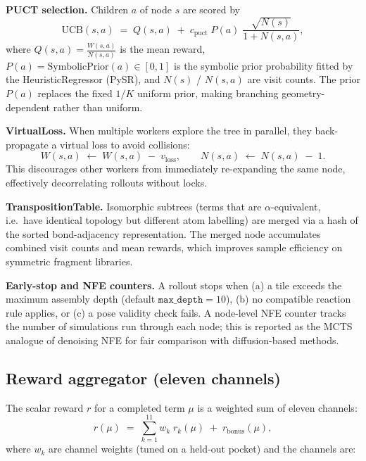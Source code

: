 \documentclass[10pt]{article}
\begin{document}
\medskip\noindent\textbf{PUCT selection.}
Children $a$ of node $s$ are scored by
\[
  \text{UCB}(s,a)
  \;=\;
  Q(s,a)
  \;+\;
  c_{\text{puct}}\;P(a)\;
  \frac{\sqrt{N(s)}}{1+N(s,a)} ,
\]
where $Q(s,a)=\frac{W(s,a)}{N(s,a)}$ is the mean reward,
$P(a)=\text{SymbolicPrior}(a)\in[0,1]$ is the symbolic prior probability
fitted by the HeuristicRegressor (PySR), and $N(s)$ / $N(s,a)$ are visit
counts.  The prior $P(a)$ replaces the fixed $1/K$ uniform prior, making
branching geometry-dependent rather than uniform.

\medskip\noindent\textbf{VirtualLoss.}
When multiple workers explore the tree in parallel, they back-propagate a
virtual loss \cite{addington2021alphazero} to avoid collisions:
\[
  W(s,a) \;\leftarrow\; W(s,a) \;-\; v_{\text{loss}},
  \qquad
  N(s,a) \;\leftarrow\; N(s,a) \;-\; 1 .
\]
This discourages other workers from immediately re-expanding the same node,
effectively decorrelating rollouts without locks.

\medskip\noindent\textbf{TranspositionTable.}
Isomorphic subtrees (terms that are $\alpha$-equivalent, i.e.\ have identical
topology but different atom labelling) are merged via a hash of the sorted
bond-adjacency representation.  The merged node accumulates combined visit
counts and mean rewards, which improves sample efficiency on symmetric
fragment libraries.

\medskip\noindent\textbf{Early-stop and NFE counters.}
A rollout stops when (a) a tile exceeds the maximum assembly depth (default
$\texttt{max\_depth}=10$), (b) no compatible reaction rule applies, or (c) a
pose validity check fails.  A node-level NFE counter tracks the number of
simulations run through each node; this is reported as the MCTS analogue of
denoising NFE for fair comparison with diffusion-based methods.

\subsection{Reward aggregator (eleven channels)}

The scalar reward $r$ for a completed term $\mu$ is a weighted sum of eleven
channels:
\[
  r(\mu)
  \;=\;
  \sum_{k=1}^{11} w_k\;r_k(\mu)
  \;+\;
  r_{\text{bonus}}(\mu) ,
\]
where $w_k$ are channel weights (tuned on a held-out pocket) and the channels
are:
\end{document}
